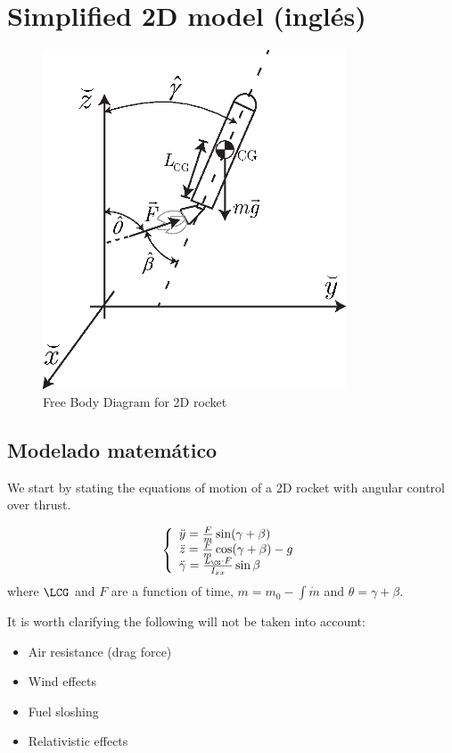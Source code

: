 
\section{Simplified 2D model (inglés)}
\begin{figure}[htb!]
	\centering
	\includegraphics[width=9cm]{fig/rocketFBD.eps}
	\caption{Free Body Diagram for 2D rocket}
	\label{fig:FBD2D}
\end{figure}

\subsection{Modelado matemático}
We start by stating the equations of motion of a 2D rocket with angular control over thrust.

\[
\left\{
\begin{array}{l}
	\ddot{y}=\frac{F}{m} \sin(\gamma+\beta) \\
	\ddot{z}=\frac{F}{m} \cos (\gamma+\beta)-g \\
	\ddot{\gamma} = \frac{L_{\CG}\cdot F}{I_{xx}}\sin\beta
\end{array}
\right.
\]
where \(\LCG\) and \(F\) are a function of time, $m =m_0 - \int \dot{m} $ and $\theta = \gamma+\beta$. 

It is worth clarifying the following will not be taken into account:
\begin{itemize}
	\item Air resistance (drag force)
	\item Wind effects
	\item Fuel sloshing
	\item Relativistic effects
\end{itemize}

